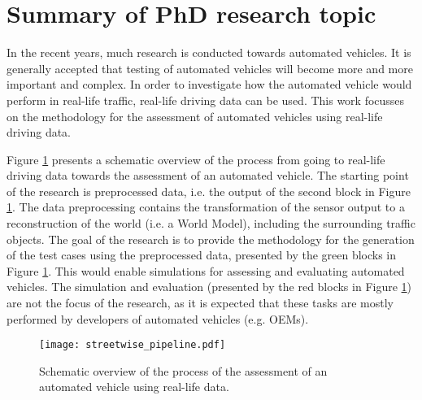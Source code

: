 \documentclass[10pt,final,a4paper,oneside,onecolumn]{article}
\begin{document}
\section*{Summary of PhD research topic}

In the recent years, much research is conducted towards automated vehicles. It is generally accepted that testing of automated vehicles will become more and more important and complex. In order to investigate how the automated vehicle would perform in real-life traffic, real-life driving data can be used. This work focusses on the methodology for the assessment of automated vehicles using real-life driving data.

Figure \ref{fig:scheme} presents a schematic overview of the process from going to real-life driving data towards the assessment of an automated vehicle. The starting point of the research is preprocessed data, i.e. the output of the second block in Figure \ref{fig:scheme}. The data preprocessing contains the transformation of the sensor output to a reconstruction of the world (i.e. a World Model), including the surrounding traffic objects. The goal of the research is to provide the methodology for the generation of the test cases using the preprocessed data, presented by the green blocks in Figure \ref{fig:scheme}. This would enable simulations for assessing and evaluating automated vehicles. The simulation and evaluation (presented by the red blocks in Figure \ref{fig:scheme}) are not the focus of the research, as it is expected that these tasks are mostly performed by developers of automated vehicles (e.g. OEMs).

\begin{figure}[b]
	\begin{center}
		\texttt{[image: streetwise\_pipeline.pdf]}
		\caption{Schematic overview of the process of the assessment of an automated vehicle using real-life data.}
		\label{fig:scheme}
	\end{center}
\end{figure}
\end{document}
